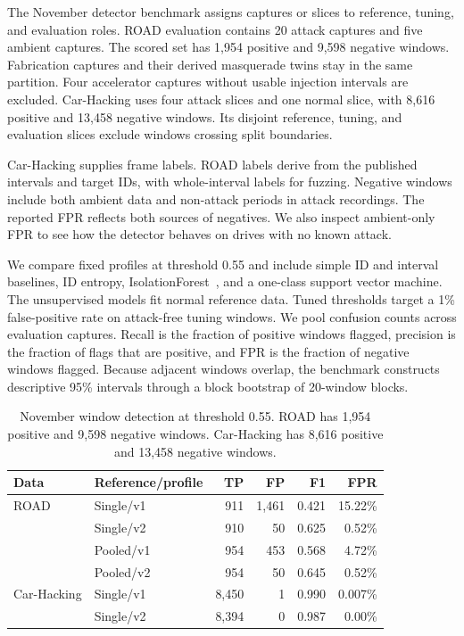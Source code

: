 \documentclass[sigconf,pbalance=true]{acmart}
\begin{document}
The November detector benchmark assigns captures or slices to reference, tuning, and evaluation roles. ROAD evaluation contains 20 attack captures and five ambient captures. The scored set has 1,954 positive and 9,598 negative windows. Fabrication captures and their derived masquerade twins stay in the same partition. Four accelerator captures without usable injection intervals are excluded. Car-Hacking uses four attack slices and one normal slice, with 8,616 positive and 13,458 negative windows. Its disjoint reference, tuning, and evaluation slices exclude windows crossing split boundaries.

Car-Hacking supplies frame labels. ROAD labels derive from the published intervals and target IDs, with whole-interval labels for fuzzing. Negative windows include both ambient data and non-attack periods in attack recordings. The reported FPR reflects both sources of negatives. We also inspect ambient-only FPR to see how the detector behaves on drives with no known attack.

We compare fixed profiles at threshold 0.55 and include simple ID and interval baselines, ID entropy, IsolationForest~\cite{liu2008isolation}, and a one-class support vector machine. The unsupervised models fit normal reference data. Tuned thresholds target a 1\% false-positive rate on attack-free tuning windows. We pool confusion counts across evaluation captures. Recall is the fraction of positive windows flagged, precision is the fraction of flags that are positive, and FPR is the fraction of negative windows flagged. Because adjacent windows overlap, the benchmark constructs descriptive 95\% intervals through a block bootstrap of 20-window blocks.

\begin{table}[t]
  \caption{November window detection at threshold 0.55. ROAD has 1,954 positive and 9,598 negative windows. Car-Hacking has 8,616 positive and 13,458 negative windows.}
  \label{tab:detector}
  \small
  \centering
  \begin{tabular}{@{}llrrrr@{}}
  \toprule
  Data & Reference/profile & TP & FP & F1 & FPR \\
  \midrule
  ROAD & Single/v1 & 911 & 1,461 & 0.421 & 15.22\% \\
       & Single/v2 & 910 & 50 & 0.625 & 0.52\% \\
       & Pooled/v1 & 954 & 453 & 0.568 & 4.72\% \\
       & Pooled/v2 & 954 & 50 & 0.645 & 0.52\% \\
  Car-Hacking & Single/v1 & 8,450 & 1 & 0.990 & 0.007\% \\
              & Single/v2 & 8,394 & 0 & 0.987 & 0.00\% \\
  \bottomrule
  \end{tabular}
\end{table}
\end{document}
